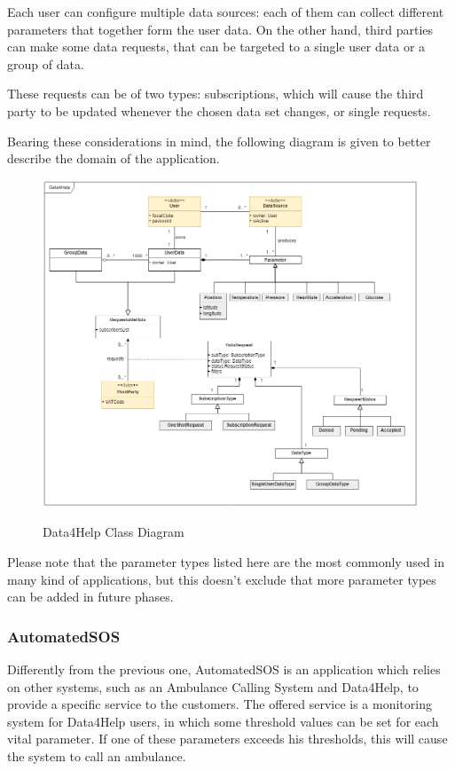 Each user can configure multiple data sources: each of them can collect different parameters that together form the user data. On the other hand, third parties can make some data requests, that can be targeted to a single user data or a group of data.

These requests can be of two types: subscriptions, which will cause the third party to be updated whenever the chosen data set changes, or single requests.

Bearing these considerations in mind, the following diagram is given to better describe the domain of the application.

\begin{figure}[h!]
	\centering
	\includegraphics[width = \linewidth] {../Diagrams/ClassDiagram-General.png}\\[1.0 cm]
	\caption{Data4Help Class Diagram}
\end{figure}

Please note that the parameter types listed here are the most commonly used in many kind of applications, but this doesn't exclude that more parameter types can be added in future phases.
\newpage
\subsubsection{AutomatedSOS}
Differently from the previous one, AutomatedSOS is an application which relies on other systems, such as an Ambulance Calling System and Data4Help, to provide a specific service to the customers. 
The offered service is a monitoring system for Data4Help users, in which some threshold values can be set for each vital parameter. If one of these parameters exceeds his thresholds, this will cause the system to call an ambulance.

